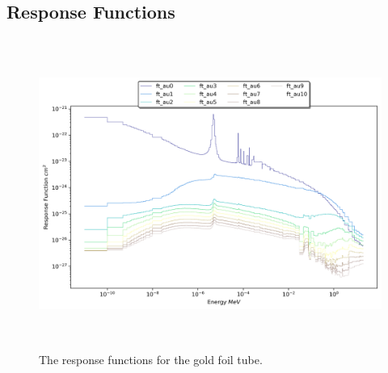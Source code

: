 
%






\subsection{Response Functions}



\begin{figure}[htb]
\centering
\includegraphics[height=4in]{tex/figures/ft_au.png}
\caption[Gold Foil Tube Response Functions]{The response functions for the gold foil tube.}
\label{fig:ft_au_rfs}
\end{figure}

